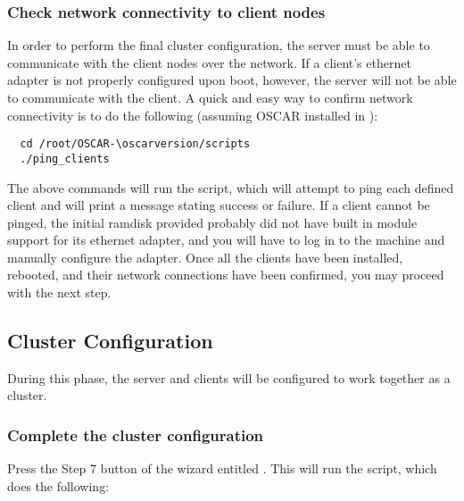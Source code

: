 \subsubsection{Check network connectivity to client nodes}

In order to perform the final cluster configuration, the server must
be able to communicate with the client nodes over the network. If a
client's ethernet adapter is not properly configured upon boot,
however, the server will not be able to communicate with the client. A
quick and easy way to confirm network connectivity is to do the
\begchange
following (assuming OSCAR installed in ):

\begin{verbatim}
  cd /root/OSCAR-\oscarversion/scripts
  ./ping_clients
\end{verbatim}
\endchange

The above commands will run the  script, which will
attempt to ping each defined client and will print a message stating
success or failure. If a client cannot be pinged, the initial ramdisk
provided probably did not have built in module support for its
ethernet adapter, and you will have to log in to the machine and
manually configure the adapter. Once all the clients have been
installed, rebooted, and their network connections have been
confirmed, you may proceed with the next step.


\subsection{Cluster Configuration}

During this phase, the server and clients will be configured to work
together as a cluster.

\subsubsection{Complete the cluster configuration}

Press the Step 7 button of the wizard entitled .  This will run the  script,
which does the following:

